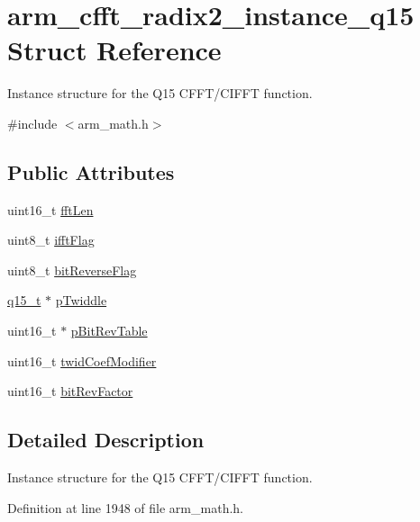 \hypertarget{structarm__cfft__radix2__instance__q15}{}\section{arm\+\_\+cfft\+\_\+radix2\+\_\+instance\+\_\+q15 Struct Reference}
\label{structarm__cfft__radix2__instance__q15}


Instance structure for the Q15 C\+F\+F\+T/\+C\+I\+F\+FT function.  




{\ttfamily \#include $<$arm\+\_\+math.\+h$>$}

\subsection*{Public Attributes}
\begin{DoxyCompactItemize}
\item 
uint16\+\_\+t \hyperlink{structarm__cfft__radix2__instance__q15_a874085647351dcf3f0de39d2b1d49744}{fft\+Len}
\item 
uint8\+\_\+t \hyperlink{structarm__cfft__radix2__instance__q15_ab5c073286bdd2f6e2bf783ced36bf1de}{ifft\+Flag}
\item 
uint8\+\_\+t \hyperlink{structarm__cfft__radix2__instance__q15_af8300c1f60caa21e6b44b9240ab5af19}{bit\+Reverse\+Flag}
\item 
\hyperlink{arm__math_8h_ab5a8fb21a5b3b983d5f54f31614052ea}{q15\+\_\+t} $\ast$ \hyperlink{structarm__cfft__radix2__instance__q15_a3809dd15e7cbf1a054c728cfbbb0cc5a}{p\+Twiddle}
\item 
uint16\+\_\+t $\ast$ \hyperlink{structarm__cfft__radix2__instance__q15_ab88afeff6493be3c8b5e4530efa82d51}{p\+Bit\+Rev\+Table}
\item 
uint16\+\_\+t \hyperlink{structarm__cfft__radix2__instance__q15_a6f2ab87fb4c568656e1f92f687b5c850}{twid\+Coef\+Modifier}
\item 
uint16\+\_\+t \hyperlink{structarm__cfft__radix2__instance__q15_a8722720c542cabd41df83fe88ef4f4cb}{bit\+Rev\+Factor}
\end{DoxyCompactItemize}


\subsection{Detailed Description}
Instance structure for the Q15 C\+F\+F\+T/\+C\+I\+F\+FT function. 

Definition at line 1948 of file arm\+\_\+math.\+h.



